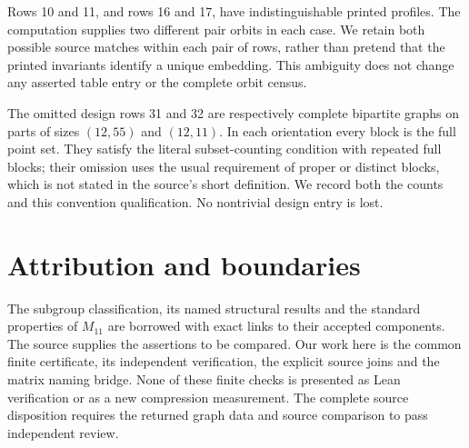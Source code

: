 \documentclass[11pt]{article}
\begin{document}
Rows 10 and 11, and rows 16 and 17, have indistinguishable printed profiles.
The computation supplies two different pair orbits in each case. We retain
both possible source matches within each pair of rows, rather than pretend
that the printed invariants identify a unique embedding. This ambiguity
does not change any asserted table entry or the complete orbit census.

The omitted design rows 31 and 32 are respectively complete bipartite
graphs on parts of sizes $(12,55)$ and $(12,11)$. In each orientation every
block is the full point set. They satisfy the literal subset-counting
condition with repeated full blocks; their omission uses the usual
requirement of proper or distinct blocks, which is not stated in the
source's short definition. We record both the counts and this convention
qualification. No nontrivial design entry is lost.

\section{Attribution and boundaries}
The subgroup classification, its named structural results and the standard
properties of $M_{11}$ are borrowed with exact links to their accepted
components. The source supplies the assertions to be compared. Our work
here is the common finite certificate, its independent verification, the
explicit source joins and the matrix naming bridge. None of these finite
checks is presented as Lean verification or as a new compression measurement.
The complete source disposition requires the returned graph data and source
comparison to pass independent review.

\end{document}
